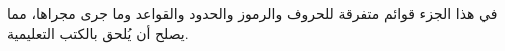 \documentclass[../../include/open-logic-part]{subfiles}
\begin{document}

\begin{editorial}
  في هذا الجزء قوائم متفرقة للحروف والرموز والحدود والقواعد وما جرى
  مجراها، مما يصلح أن يُلحق بالكتب التعليمية.
\end{editorial}



\OLEndPartHook
\end{document}

